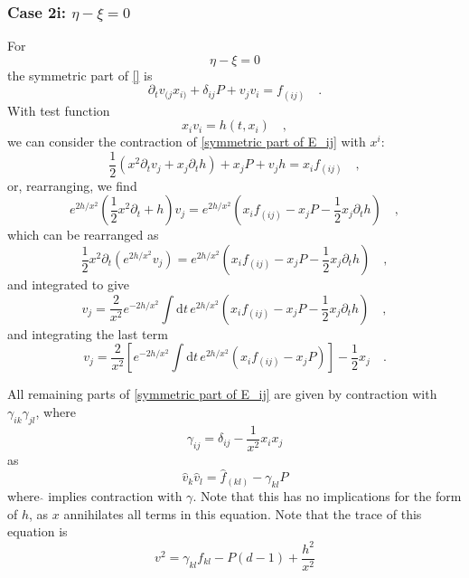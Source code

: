 \documentclass[10pt,a4paper]{article}
\newcommand{\ud}{\mathrm{d}}
\begin{document}
\subsubsection{Case 2i: $\eta - \xi = 0$}

For
\begin{equation}
\eta - \xi = 0
\end{equation}
the symmetric part of \eqref{} is
\begin{equation}
\partial_t v_{(j} x_{i)} + \delta_{ij} P + v_j v_i = f_{(ij)} \quad.
\label{symmetric part of E_ij}
\end{equation}
With test function
\begin{equation}
x_i v_i = h(t, x_i) \quad,
\end{equation}
we can consider the contraction of \eqref{symmetric part of E_ij} with $x^i$:
\begin{equation}
\frac{1}{2} \left(x^2 \partial_t v_j + x_j \partial_t h \right) + x_j P + v_j h = x_i f_{(ij)} \quad,
\end{equation}
or, rearranging, we find
\begin{equation}
e^{2h/x^2}\left( \frac{1}{2} x^2 \partial_t + h \right) v_j = e^{2h/x^2} \left( x_i f_{(ij)} - x_j P - \frac{1}{2} x_j \partial_t h \right) \quad,
\end{equation}
which can be rearranged as
\begin{equation}
\frac{1}{2} x^2 \partial_t \left( e^{2h/x^2} v_j \right) = e^{2h/x^2} \left( x_i f_{(ij)} - x_j P - \frac{1}{2} x_j \partial_t h \right) \quad,
\end{equation}
and integrated to give
\begin{equation}
v_j = \frac{2}{x^2} e^{-2h/x^2} \int \ud t \, e^{2h/x^2} \left( x_i f_{(ij)} - x_j P - \frac{1}{2} x_j \partial_t h \right) \quad,
\end{equation}
and integrating the last term
\begin{equation}
v_j = \frac{2}{x^2} \left[ e^{-2h/x^2} \int \ud t \, e^{2h/x^2} \left( x_i f_{(ij)} - x_j P \right) \right] - \frac{1}{2} x_j \quad.
\label{velocity from symmetric}
\end{equation}

All remaining parts of \eqref{symmetric part of E_ij} are given by contraction with $\gamma_{ik}\gamma_{jl}$, where
\begin{equation}
\gamma_{ij} = \delta_{ij} - \frac{1}{x^2}x_i x_j
\end{equation}
as
\begin{equation}
\hat v_k \hat v_l = \hat f_{(kl)} - \gamma_{kl} P
\label{projected symmetric}
\end{equation}
where $\hat{}$ implies contraction with $\gamma$. Note that this has no implications for the form of $h$, as $x$ annihilates all terms in this equation. Note that the trace of this equation is
\begin{equation}
v^2 = \gamma_{kl} f_{kl} - P(d - 1) +  \frac{h^2}{x^2}
\end{equation}
\end{document}
